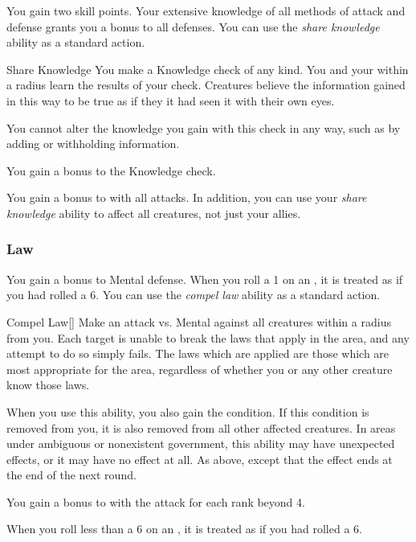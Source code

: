              You gain two skill points.
             Your extensive knowledge of all methods of attack and defense grants you a  bonus to all defenses.
             You can use the \textit{share knowledge} ability as a standard action.
            \begin{freeability}{Share Knowledge}
                You make a Knowledge check of any kind.
                You and your  within a \arealarge radius learn the results of your check.
                Creatures believe the information gained in this way to be true as if they it had seen it with their own eyes.

                You cannot alter the knowledge you gain with this check in any way, such as by adding or withholding information.

                \rankline
                 You gain a  bonus to the Knowledge check.
            \end{freeability}
             You gain a  bonus to  with all attacks.
            In addition, you can use your \textit{share knowledge} ability to affect all creatures, not just your allies.

        \subsubsection{Law}
             You gain a  bonus to Mental defense.
             When you roll a 1 on an , it is treated as if you had rolled a 6.
             You can use the \textit{compel law} ability as a standard action.
            \begin{freeability}{Compel Law}[]
                Make an attack vs. Mental against all creatures within a \arealarge radius from you.
                \hit Each target is unable to break the laws that apply in the area, and any attempt to do so simply fails.
                The laws which are applied are those which are most appropriate for the area, regardless of whether you or any other creature know those laws.

                When you use this ability, you also gain the condition.
                If this condition is removed from you, it is also removed from all other affected creatures.
                In areas under ambiguous or nonexistent government, this ability may have unexpected effects, or it may have no effect at all.
                \glance As above, except that the effect ends at the end of the next round.

                \rankline
                You gain a  bonus to  with the attack for each rank beyond 4.
            \end{freeability}
             When you roll less than a 6 on an , it is treated as if you had rolled a 6.

